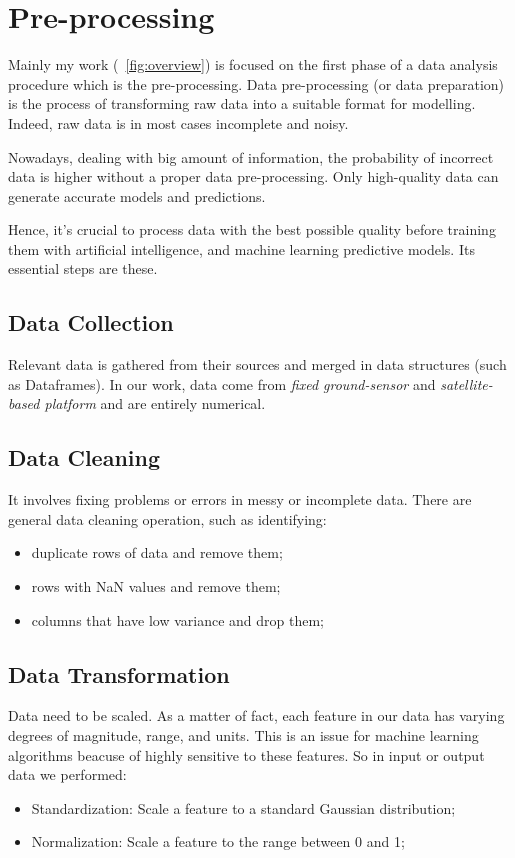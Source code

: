 \section{Pre-processing}
Mainly my work (~\ref{fig:overview}) is focused on the first phase of a data analysis procedure which is the pre-processing.
Data pre-processing (or data preparation) is the process of transforming raw data into a suitable format for modelling. 
Indeed, raw data is in most cases incomplete and noisy.\par
Nowadays, dealing with big amount of information, the probability of incorrect data is higher without a proper data pre-processing.
Only high-quality data can generate accurate models and predictions. \par
Hence, it’s crucial to process data with the best possible quality before training them with artificial intelligence, and machine learning predictive models.
Its essential steps are these.

\subsection{Data Collection}
Relevant data is gathered from their sources and merged in data structures (such as Dataframes). In our work, data come from \textit{fixed ground-sensor} and \textit{satellite-based platform} and are entirely numerical.
\subsection{Data Cleaning}
It involves fixing problems or errors in messy or incomplete data. There are general data cleaning operation, such as identifying:
\begin{itemize}
\item duplicate rows of data and remove them;
\item rows with NaN values and remove them;
\item columns that have low variance and drop them;
\end{itemize}
\subsection{Data Transformation}
Data need to be scaled. As a matter of fact, each feature in our data has varying degrees of magnitude, range, and units. This is an issue for machine learning algorithms beacuse of highly sensitive to these features. So in input or output data we performed:
\begin{itemize}
\item Standardization: Scale a feature to a standard Gaussian distribution;
\item Normalization: Scale a feature to the range between 0 and 1;
\end{itemize}
